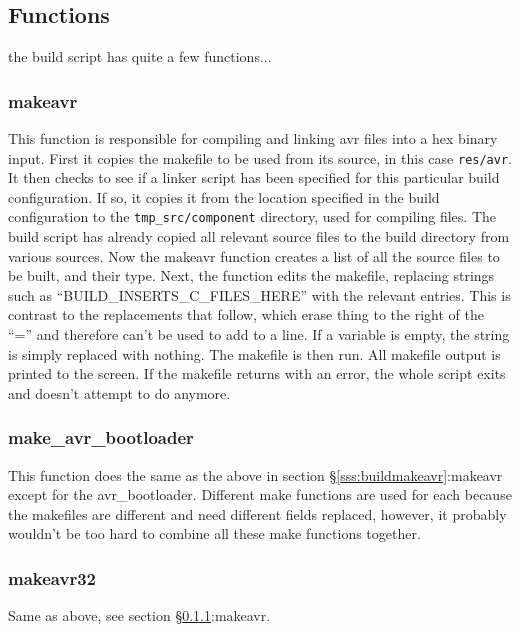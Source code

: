 \documentclass[a4paper, oneside, 11pt, titlepage, onecolumn, openright]{report}
\begin{document}
\subsection{Functions}
			\label{ss:buildFunctions}
			the build script has quite a few functions...
			
\subsubsection{makeavr}
			\label{sss:buildMakeavr}
			This function is responsible for compiling and linking avr files into a hex binary input.\newline
			First it copies the makefile to be used from its source, in this case \texttt{res/avr}.\newline
			It then checks to see if a linker script has been specified for this particular build configuration. If so, it copies it from the location specified in the build configuration to the \texttt{tmp\_src/component} directory, used for compiling files.\newline
			The build script has already copied all relevant source files to the build directory from various sources. Now the makeavr function creates a list of all the source files to be built, and their type.\newline
			Next, the function edits the makefile, replacing strings such as ``BUILD\_INSERTS\_C\_FILES\_HERE'' with the relevant entries. This is contrast to the replacements that follow, which erase thing to the right of the ``='' and therefore can't be used to add to a line. If a variable is empty, the string is simply replaced with nothing.\newline
			The makefile is then run. All makefile output is printed to the screen. If the makefile returns with an error, the whole script exits and doesn't attempt to do anymore.
			
\subsubsection{make\_avr\_bootloader}
			\label{sss:buildMakeavrbootloader}
			This function does the same as the above in section \S\ref{sss:buildmakeavr}:makeavr except for the avr\_bootloader. Different make functions are used for each because the makefiles are different and need different fields replaced, however, it probably wouldn't be too hard to combine all these make functions together.
			
\subsubsection{makeavr32}
			\label{sss:buildMakeavr32}
			Same as above, see section \S\ref{sss:buildMakeavr}:makeavr.
			
\end{document}
